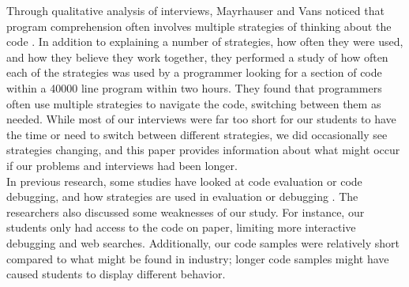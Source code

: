 Through qualitative analysis of interviews, Mayrhauser and Vans noticed that program comprehension often involves multiple strategies of thinking about the code \cite{402076}.
In addition to explaining a number of strategies, how often they were used, and how they believe they work together, they performed a study of how often each of the strategies was used by a programmer looking for a section of code within a 40000 line program within two hours. They found that programmers often use multiple strategies to navigate the code, switching between them as needed.
While most of our interviews were far too short for our students to have the time or need to switch between different strategies, we did occasionally see strategies changing, and this paper provides information about what might occur if our problems and interviews had been longer. \\

In previous research, some studies have looked at code evaluation or code debugging, and how strategies are used in evaluation or debugging \cite{mosemann2001}  \cite{fitzgerald2008} \cite{1021348} \cite{402076}.
The researchers also discussed some weaknesses of our study. 
For instance, our students only had access to the code on paper, limiting more interactive debugging and web searches.
Additionally, our code samples were relatively short compared to what might be found in industry;
 longer code samples might have caused students to display different behavior.

\newpage
